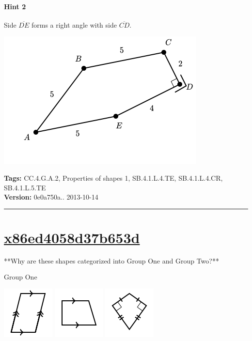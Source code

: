 \documentclass[twocolumn,10pt]{article}
\def\shrinkfactor{0.55}
\begin{document}
\paragraph{Hint 2}Side $\overline{DE}$ forms a right angle with side $\overline{CD}$.

\includegraphics[scale=\shrinkfactor]{figures/6c13c7c1fe841eb9f59f05098c59c6e31e785bcb.png}



\medskip
\noindent
\textbf{Tags:} {\footnotesize CC.4.G.A.2, Properties of shapes 1, SB.4.1.L.4.TE, SB.4.1.L.4.CR, SB.4.1.L.5.TE}\\
\textbf{Version:} 0e0a750a.. 2013-10-14
\smallskip\hrule





\section{\href{https://www.khanacademy.org/devadmin/content/items/x86ed4058d37b653d}{x86ed4058d37b653d}}

\noindent
**Why are these shapes categorized into Group One and Group Two?** 

Group One 


\includegraphics[scale=\shrinkfactor]{figures/feaa75a1e077e1d8ea6873bc2a4aa206d3c95598.png} 
\includegraphics[scale=\shrinkfactor]{figures/53c957e1607d463070480943456fd8435ab45b5d.png} 
\includegraphics[scale=\shrinkfactor]{figures/be0b4c8e85edc438c12910c91d66875e8fcd2372.png}
\end{document}
